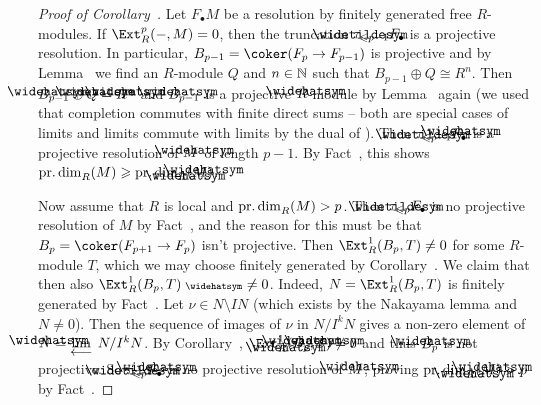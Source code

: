 \documentclass[a4paper,parskip=half,numbers=enddot, DIV=12]{scrreprt}
\renewcommand{\geq}{\geqslant}
\renewcommand{\leq}{\leqslant}
\begin{document}
\begin{proof}[Proof of Corollary~]
	Let $F_\bullet M$ be a resolution by finitely generated free $R$-modules. If $\Ext_R^p(-,M)=0$, then the truncation $\snake{\tau}_{\leq p-1}F_\bullet$ is a projective resolution. In particular, $B_{p-1}=\coker(F_p\morphism F_{p-1})$ is projective and by Lemma~ we find an $R$-module $Q$ and $n\in\mathbb{N}$ such that $B_{p-1}\oplus Q\cong R^n$. Then $\roof{B}_{p-1}\oplus\roof{Q}=\roof{R}^n$ and $\roof{B}_{p-1}$ is a projective $\roof{R}$-module by Lemma~ again (we used that completion commutes with finite direct sums -- both are special cases of limits and limits commute with limits by the dual of \cite[Corollary~A.1.1]{alggeo2}). Then $\snake{\tau}_{\leq p-1}\roof{F}_\bullet$ is a projective resolution of $\roof{M}$ of length $p-1$. By Fact~, this shows $\pdim_R(M)\geq\pdim_{\roof{R}}(\roof{M})$.
	
	Now assume that $R$ is local and $\operatorname{pr.dim}_R(M)>p$. Then $\snake{\tau}_{\leq p}F_\bullet$ is no projective resolution of $M$ by Fact~, and the reason for this must be that $B_p=\coker(F_{p+1}\morphism F_p)$ isn't projective. Then $\Ext_R^1(B_p,T)\neq 0$ for some $R$-module $T$, which we may choose finitely generated by Corollary~. We claim that then also $\Ext_R^1(B_p,T)^\complete \neq 0$. Indeed, $N=\Ext_R^1(B_p,T)$ is finitely generated by Fact~. Let $\nu\in N\setminus IN$ (which exists by the Nakayama lemma and $N\neq 0$). Then the sequence of images of $\nu$ in $N/I^kN$ gives a non-zero element of $\roof{N}=\limit N/I^kN$. By Corollary~, $\Ext_{\roof{R}}^1(\roof{B}_p,\roof{T})\neq 0$ and thus $\roof{B}_p$ is not projective. So $\snake{\tau}_{\leq p}\roof{F}_\bullet$ is no projective resolution of $\roof{M}$, proving $\pdim_{\roof{R}}(\roof{M})>p$ by Fact~.
\end{proof}
\end{document}
